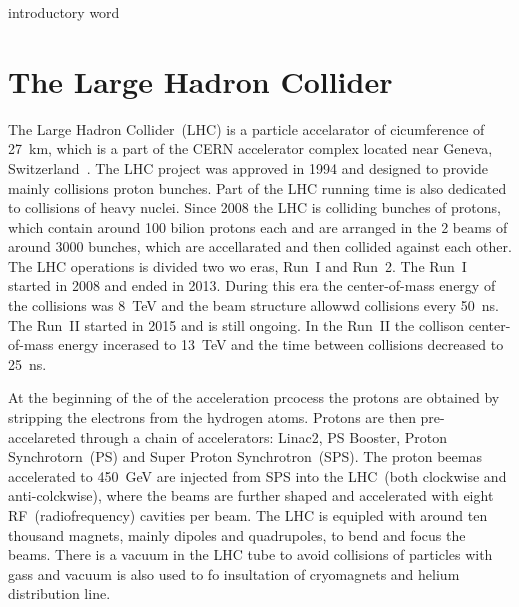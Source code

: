 \clearpage

\setcounter{secnumdepth}{4}
\setcounter{secnumdepth}{4}

introductory word

\section{The Large Hadron Collider}

The Large Hadron Collider~(LHC) is a particle accelarator of cicumference of 27~km, which is a part of the CERN accelerator complex located near Geneva, Switzerland~\cite{CERN-Brochure-2017-002-Eng, Evans:2008zzb}. The LHC project was approved in 1994 and designed to provide mainly collisions proton bunches. Part of the LHC running time is also dedicated to collisions of heavy nuclei. Since 2008 the LHC is colliding bunches of protons, which contain around 100 bilion protons each and are arranged in the 2 beams of around 3000 bunches, which are accellarated and then collided against each other. The LHC operations is divided two wo eras, Run~I and Run~2. The Run~I started in 2008 and ended in 2013. During this era the center-of-mass energy of the collisions was 8~TeV and the beam structure allowwd collisions every 50~ns. The Run~II started in 2015 and is still ongoing. In the Run~II the collison center-of-mass energy incerased to 13~TeV and the time between collisions decreased to 25~ns.

At the beginning of the of the acceleration prcocess the protons are obtained by stripping the electrons from the hydrogen atoms. Protons are then pre-accelareted through a chain of accelerators: Linac2, PS Booster, Proton Synchrotorn~(PS) and Super Proton Synchrotron~(SPS). The proton beemas accelerated to 450~GeV are injected from SPS into the LHC~(both clockwise and anti-colckwise), where the beams are further shaped and accelerated with eight RF~(radiofrequency) cavities per beam. The LHC is equipled with around ten thousand magnets, mainly dipoles and quadrupoles, to bend and focus the beams. There is a vacuum in the LHC tube to avoid collisions of particles with gass and vacuum is also used to fo insultation of cryomagnets and helium distribution line.

